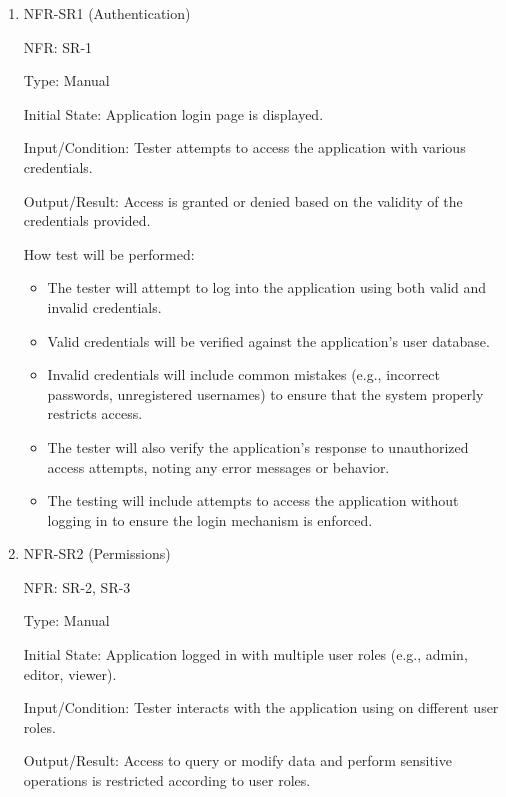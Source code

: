 \documentclass[12pt, titlepage]{article}
\begin{document}
\begin{enumerate}

\item{NFR-SR1 (Authentication)\\}
  
  NFR: SR-1
  
  Type: Manual
  
  Initial State: Application login page is displayed.
  
  Input/Condition: Tester attempts to access the application with various
  credentials.
  
  Output/Result: Access is granted or denied based on the validity of the
  credentials provided.
  
  How test will be performed: 
  \begin{itemize}
    \item The tester will attempt to log into the application using both valid
    and invalid credentials.
    \item Valid credentials will be verified against the application's user
    database.
    \item Invalid credentials will include common mistakes (e.g., incorrect
    passwords, unregistered usernames) to ensure that the system properly
    restricts access.
    \item The tester will also verify the application's response to unauthorized
    access attempts, noting any error messages or behavior.
    \item The testing will include attempts to access the application without
    logging in to ensure the login mechanism is enforced.
  \end{itemize}

\item{NFR-SR2 (Permissions)\\}
  
  NFR: SR-2, SR-3
  
  Type: Manual
  
  Initial State: Application logged in with multiple user roles (e.g., admin,
  editor, viewer).
  
  Input/Condition: Tester interacts with the application using on different user
  roles.
  
  Output/Result: Access to query or modify data and perform sensitive operations
  is restricted according to user roles.
  

\end{enumerate}
\end{document}
